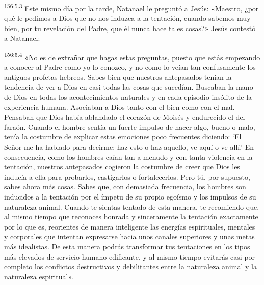 \par 
\textsuperscript{156:5.3} Este mismo día por la tarde, Natanael le preguntó a Jesús: «Maestro, ¿por qué le pedimos a Dios que no nos induzca a la tentación, cuando sabemos muy bien, por tu revelación del Padre, que él nunca hace tales cosas?» Jesús contestó a Natanael:

\par 
\textsuperscript{156:5.4} «No es de extrañar que hagas estas preguntas, puesto que estás empezando a conocer al Padre como yo lo conozco, y no como lo veían tan confusamente los antiguos profetas hebreos. Sabes bien que nuestros antepasados tenían la tendencia de ver a Dios en casi todas las cosas que sucedían. Buscaban la mano de Dios en todas los acontecimientos naturales y en cada episodio insólito de la experiencia humana. Asociaban a Dios tanto con el bien como con el mal. Pensaban que Dios había ablandado el corazón de Moisés y endurecido el del faraón. Cuando el hombre sentía un fuerte impulso de hacer algo, bueno o malo, tenía la costumbre de explicar estas emociones poco frecuentes diciendo: `El Señor me ha hablado para decirme: haz esto o haz aquello, ve aquí o ve allí.' En consecuencia, como los hombres caían tan a menudo y con tanta violencia en la tentación, nuestros antepasados cogieron la costumbre de creer que Dios les inducía a ella para probarlos, castigarlos o fortalecerlos. Pero tú, por supuesto, sabes ahora más cosas. Sabes que, con demasiada frecuencia, los hombres son inducidos a la tentación por el ímpetu de su propio egoísmo y los impulsos de su naturaleza animal. Cuando te sientas tentado de esta manera, te recomiendo que, al mismo tiempo que reconoces honrada y sinceramente la tentación exactamente por lo que es, reorientes de manera inteligente las energías espirituales, mentales y corporales que intentan expresarse hacia unos canales superiores y unas metas más idealistas. De esta manera podrás transformar tus tentaciones en los tipos más elevados de servicio humano edificante, y al mismo tiempo evitarás casi por completo los conflictos destructivos y debilitantes entre la naturaleza animal y la naturaleza espiritual».

